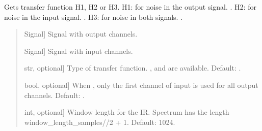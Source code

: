 \documentclass[letterpaper,10pt,english]{sphinxmanual}
\begin{document}
\begin{fulllineitems}
\label{\detokenize{modules/dsptoolbox.transfer_functions:dsptoolbox.transfer_functions.compute_transfer_function}}
\pysigstartsignatures
{}
\pysigstopsignatures
\sphinxAtStartPar
Gets transfer function H1, H2 or H3.
H1: for noise in the output signal. .
H2: for noise in the input signal. .
H3: for noise in both signals. .
\begin{quote}\begin{description}
\begin{description}
\sphinxlineitem{\sphinxstylestrong{output}}{[}Signal{]}
\sphinxAtStartPar
Signal with output channels.

\sphinxlineitem{\sphinxstylestrong{input}}{[}Signal{]}
\sphinxAtStartPar
Signal with input channels.

\sphinxlineitem{\sphinxstylestrong{mode}}{[}str, optional{]}
\sphinxAtStartPar
Type of transfer function. ,  and  are available.
Default: .

\sphinxlineitem{\sphinxstylestrong{multichannel}}{[}bool, optional{]}
\sphinxAtStartPar
When ,  only the first channel of input is used for all output
channels. Default: .

\sphinxlineitem{\sphinxstylestrong{window\_length\_samples}}{[}int, optional{]}
\sphinxAtStartPar
Window length for the IR. Spectrum has the length
window\_length\_samples//2 + 1. Default: 1024.


\end{description}
\end{description}
\end{quote}
\end{fulllineitems}
\end{document}
